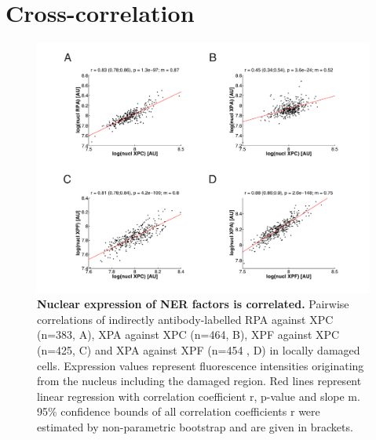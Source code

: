 \newpage
\section{Cross-correlation}

\begin{figure}[h!]
	\begin{center}
		\includegraphics[width=1\textwidth]{Abbildungen/figure_A_2.pdf}
		\caption{\textbf{Nuclear expression of NER factors is correlated.} Pairwise correlations of indirectly antibody-labelled RPA against XPC (n=383, A), XPA against XPC (n=464, B), XPF against XPC (n=425, C) and XPA against XPF (n=454 , D) in locally damaged cells. Expression values represent fluorescence intensities originating from the nucleus including the damaged region. Red lines represent linear regression with correlation coefficient r, p-value and slope m. 95\% confidence bounds of all correlation coefficients r were estimated by non-parametric bootstrap and are given in brackets. }
		\label{fig:nuklearCrosscorrelation}
	\end{center}
\end{figure}


